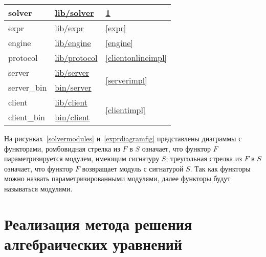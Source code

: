 \begin{centering}
\begin{longtable}{|l|l|l|}
        solver                                                    & \href{https://github.com/prekel/chapgame/blob/master/lib/solver}{lib/solver}     & \ref{solverimpl}                        \\ \hline
        expr                                                      & \href{https://github.com/prekel/chapgame/blob/master/lib/expr}{lib/expr}         & \ref{expr}                              \\ \hline
        engine                                                    & \href{https://github.com/prekel/chapgame/blob/master/lib/engine}{lib/engine}     & \ref{engine}                            \\ \hline
        protocol                                                  & \href{https://github.com/prekel/chapgame/blob/master/lib/protocol}{lib/protocol} & \ref{clientonlineimpl}                  \\ \hline
        server                                                    & \href{https://github.com/prekel/chapgame/blob/master/lib/server}{lib/server}     & \multirow{2}{*}{\ref{serverimpl}}       \\*
        server\_bin                                               & \href{https://github.com/prekel/chapgame/blob/master/bin/server}{bin/server}     &                                         \\ \hline
        client                                                    & \href{https://github.com/prekel/chapgame/blob/master/lib/client}{lib/client}     & \multirow{2}{*}{\ref{clientimpl}}       \\*
        client\_bin                                               & \href{https://github.com/prekel/chapgame/blob/master/bin/client}{bin/client}     &                                         \\ \hline
    \end{longtable}
\end{centering}

На рисунках~\ref{solvermodules} и~\ref{exprdiagramfig} представлены диаграммы с функторами,
ромбовидная стрелка из \(F\) в \(S\) означает, что функтор \(F\) параметризируется модулем, имеющим сигнатуру \(S\);
треугольная стрелка из \(F\) в \(S\) означает, что функтор \(F\) возвращает модуль с сигнатурой \(S\).
Так как функторы можно назвать параметризированными модулями, далее функторы будут называться модулями.

\section{Реализация метода решения алгебраических уравнений}\label{solverimpl}

